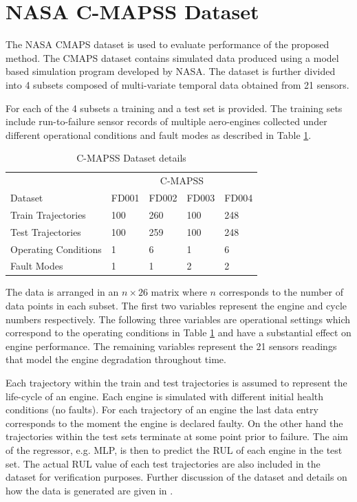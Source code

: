 \documentclass[12pt]{IEEEtran}%
\begin{document}
\section{NASA C-MAPSS Dataset}
\label{sec:rul_dataset}

The NASA CMAPS dataset \cite{CMAPS2008} is used to evaluate performance of the proposed method. The CMAPS dataset contains simulated data produced using a model based simulation program developed by NASA. The dataset is further divided into 4 subsets composed of multi-variate temporal data obtained from 21 sensors.

For each of the 4 subsets a training and a test set is provided. The training sets include run-to-failure sensor records of multiple aero-engines collected under different operational conditions and fault modes as described in Table \ref{table:cmapss}.

\begin{table}[!htb]
\centering
\begin{tabular}{l | l l l l}
	\hline
	 & \multicolumn{4}{c}{C-MAPSS}\\  
	 Dataset & FD001 & FD002 & FD003 & FD004\\
  	\hline
  	Train Trajectories & 100 & 260 & 100 & 248\\
  	Test Trajectories & 100 & 259 & 100 & 248\\
  	Operating Conditions & 1 & 6 & 1 & 6\\
  	Fault Modes & 1 & 1 & 2 & 2\\
  	\hline
\end{tabular}
\caption{C-MAPSS Dataset details}
\label{table:cmapss}
\end{table}

The data is arranged in an $n\times26$ matrix where $n$ corresponds to the number of data points in each subset. The first two variables represent the engine and cycle numbers respectively. The following three variables are operational settings which correspond to the operating conditions in Table \ref{table:cmapss} and have a substantial effect on engine performance. The remaining variables represent the 21 sensors readings that model the engine degradation throughout time.

Each trajectory within the train and test trajectories is assumed to represent the life-cycle of an engine. Each engine is simulated with different initial health conditions (no faults). For each trajectory of an engine the last data entry corresponds to the moment the engine is declared faulty. On the other hand the trajectories within the test sets terminate at some point prior to failure. The aim of the regressor, e.g. MLP, is then to predict the RUL of each engine in the test set. The actual RUL value of each test trajectories are also included in the dataset for verification purposes. Further discussion of the dataset and details on how the data is generated are given in \cite{Saxena2008}.
\end{document}
